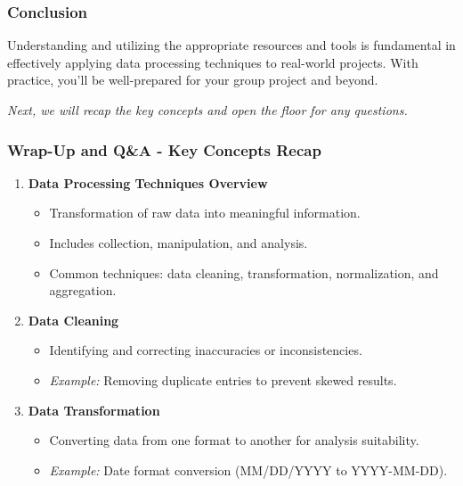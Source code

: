 \documentclass[aspectratio=169]{beamer}
\begin{document}
\begin{frame}
    \frametitle{Conclusion}
    Understanding and utilizing the appropriate resources and tools is fundamental in effectively applying data processing techniques to real-world projects. With practice, you’ll be well-prepared for your group project and beyond.

    \textit{Next, we will recap the key concepts and open the floor for any questions.}
\end{frame}

\begin{frame}[fragile]
    \frametitle{Wrap-Up and Q\&A - Key Concepts Recap}
    \begin{enumerate}
        \item \textbf{Data Processing Techniques Overview}
        \begin{itemize}
            \item Transformation of raw data into meaningful information.
            \item Includes collection, manipulation, and analysis.
            \item Common techniques: data cleaning, transformation, normalization, and aggregation.
        \end{itemize}
        
        \item \textbf{Data Cleaning}
        \begin{itemize}
            \item Identifying and correcting inaccuracies or inconsistencies.
            \item \textit{Example:} Removing duplicate entries to prevent skewed results.
        \end{itemize}
        
        \item \textbf{Data Transformation}
        \begin{itemize}
            \item Converting data from one format to another for analysis suitability.
            \item \textit{Example:} Date format conversion (MM/DD/YYYY to YYYY-MM-DD).
        \end{itemize}
    \end{enumerate}
\end{frame}
\end{document}
